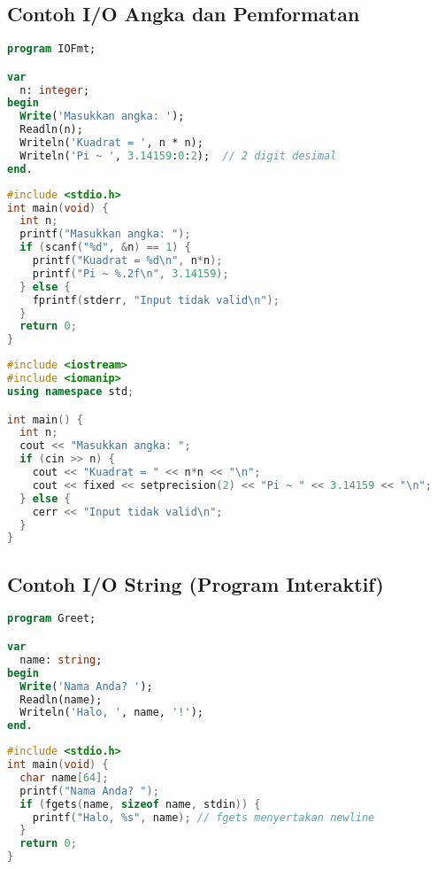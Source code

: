 \documentclass[../main.tex]{subfiles}
\begin{document}
\subsection{Contoh I/O Angka dan Pemformatan}
\begin{lstlisting}[language=Pascal, caption={Baca integer dan format keluaran (Pascal)}]
program IOFmt;

var
  n: integer;
begin
  Write('Masukkan angka: ');
  Readln(n);
  Writeln('Kuadrat = ', n * n);
  Writeln('Pi ~ ', 3.14159:0:2);  // 2 digit desimal
end.
\end{lstlisting}

\begin{lstlisting}[language=C, caption={Baca integer dan format keluaran (C)}]
#include <stdio.h>
int main(void) {
  int n;
  printf("Masukkan angka: ");
  if (scanf("%d", &n) == 1) {
    printf("Kuadrat = %d\n", n*n);
    printf("Pi ~ %.2f\n", 3.14159);
  } else {
    fprintf(stderr, "Input tidak valid\n");
  }
  return 0;
}
\end{lstlisting}

\begin{lstlisting}[language=C++, caption={Baca integer dan format keluaran (C++)}]
#include <iostream>
#include <iomanip>
using namespace std;

int main() {
  int n;
  cout << "Masukkan angka: ";
  if (cin >> n) {
    cout << "Kuadrat = " << n*n << "\n";
    cout << fixed << setprecision(2) << "Pi ~ " << 3.14159 << "\n";
  } else {
    cerr << "Input tidak valid\n";
  }
}
\end{lstlisting}

\subsection{Contoh I/O String (Program Interaktif)}
\begin{lstlisting}[language=Pascal, caption={Input nama pada Pascal}]
program Greet;

var
  name: string;
begin
  Write('Nama Anda? ');
  Readln(name);
  Writeln('Halo, ', name, '!');
end.
\end{lstlisting}

\begin{lstlisting}[language=C, caption={Input nama pada C}]
#include <stdio.h>
int main(void) {
  char name[64];
  printf("Nama Anda? ");
  if (fgets(name, sizeof name, stdin)) {
    printf("Halo, %s", name); // fgets menyertakan newline
  }
  return 0;
}
\end{lstlisting}
\end{document}
